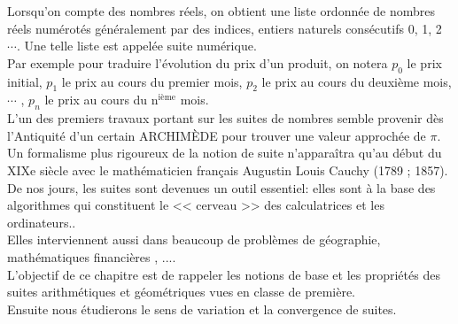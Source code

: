 


  
 Lorsqu'on compte  des nombres réels, on obtient   une liste  ordonnée de nombres réels numérotés généralement par des indices, entiers naturels consécutifs 0, 1, 2  $\cdots$. Une telle liste est appelée suite numérique.\\
Par exemple pour traduire l'évolution du prix d'un produit, on notera $ p_0 $  le prix initial, $ p_1 $ le prix au cours du premier  mois,  $ p_2 $ le prix au cours du deuxième   mois, $ \cdots $  , $ p_n $ le prix au cours du  n$^{\text{ième}}$  mois.\\
L'un des premiers travaux portant sur les suites de nombres semble provenir  dès l'Antiquité d'un certain ARCHIMÈDE  pour trouver une valeur approchée de $ \pi $.\\ Un formalisme plus rigoureux de la notion de suite n'apparaîtra qu'au
début du XIXe siècle avec le mathématicien français Augustin Louis
Cauchy (1789 ; 1857). \\
De nos jours, les suites sont devenues un outil essentiel:  elles sont à la base des algorithmes qui constituent le << cerveau >> des calculatrices et les ordinateurs.. \\
Elles  interviennent  aussi  dans beaucoup de problèmes de géographie, mathématiques financières , ....\\
 L'objectif de ce  chapitre  est de rappeler les notions de base et  les propriétés des suites arithmétiques et géométriques vues en classe de première.\\
Ensuite nous  étudierons le sens de variation et la convergence de suites.

